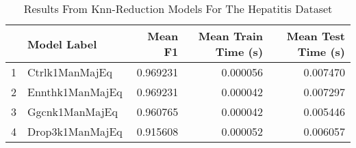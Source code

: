 \begin{table}
\centering
\caption{Results From Knn-Reduction Models For The Hepatitis Dataset}
\label{tab:knn_reduction_results_hepatitis}
\begin{tabular}{rlrrr}
\toprule
 & Model Label & Mean F1 & Mean Train Time (s) & Mean Test Time (s) \\
\midrule
1 & Ctrlk1ManMajEq & 0.969231 & 0.000056 & 0.007470 \\
2 & Ennthk1ManMajEq & 0.969231 & 0.000042 & 0.007297 \\
3 & Ggcnk1ManMajEq & 0.960765 & 0.000042 & 0.005446 \\
4 & Drop3k1ManMajEq & 0.915608 & 0.000052 & 0.006057 \\
\bottomrule
\end{tabular}
\end{table}
